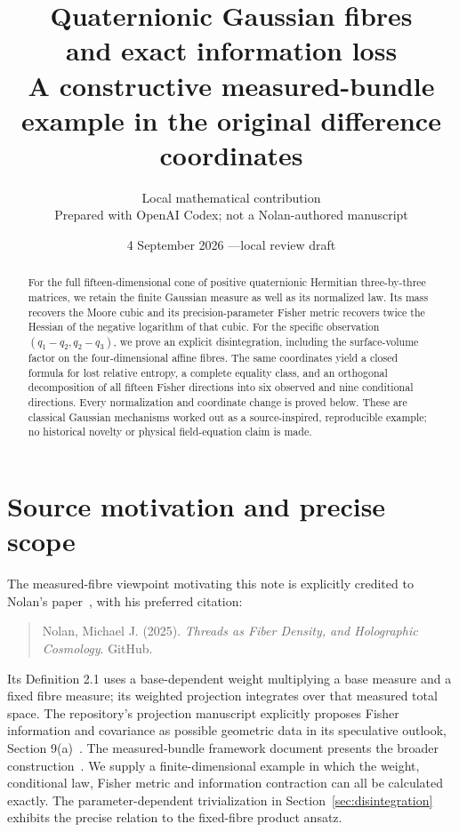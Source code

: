 \documentclass[11pt,a4paper]{article}
\title{Quaternionic Gaussian fibres\\and exact information loss\\[4pt]
\large A constructive measured-bundle example in the original difference coordinates}
\author{Local mathematical contribution\\\small Prepared with OpenAI Codex; not a Nolan-authored manuscript}
\date{4 September 2026 \quad---\quad local review draft}
\numberwithin{equation}{section}
\theoremstyle{definition}
\theoremstyle{remark}
\begin{document}
\maketitle
\begin{abstract}
For the full fifteen-dimensional cone of positive quaternionic Hermitian
three-by-three matrices, we retain the finite Gaussian measure as well as its
normalized law. Its mass recovers the Moore cubic and its precision-parameter
Fisher metric recovers twice the Hessian of the negative logarithm of that cubic.
For the specific observation $(q_1-q_2,q_2-q_3)$, we prove an explicit
disintegration, including the surface-volume factor on the four-dimensional
affine fibres. The same coordinates yield a closed formula for lost relative
entropy, a complete equality class, and an orthogonal decomposition of all
fifteen Fisher directions into six observed and nine conditional directions.
Every normalization and coordinate change is proved below. These are classical
Gaussian mechanisms worked out as a source-inspired, reproducible example;
no historical novelty or physical field-equation claim is made.
\end{abstract}

\section{Source motivation and precise scope}\label{sec:source}

The measured-fibre viewpoint motivating this note is explicitly credited to
Nolan's paper~\cite{Nolan2025Threads}, with his preferred citation:
\begin{quote}
Nolan, Michael J. (2025). \emph{Threads as Fiber Density, and Holographic
Cosmology}. GitHub.
\end{quote}
Its Definition 2.1 uses a
base-dependent weight multiplying a base measure and a fixed fibre measure;
its weighted projection integrates over that measured total space. The
repository's projection manuscript explicitly proposes Fisher information
and covariance as possible geometric data in its speculative outlook,
Section 9(a)~\cite{NolanRepository2025Projection}. The measured-bundle
framework document presents the broader construction~\cite{NolanRepository2025MBPF}.
We supply a finite-dimensional example in which the weight, conditional law,
Fisher metric and information contraction can all be calculated exactly.
The parameter-dependent trivialization in Section~\ref{sec:disintegration}
exhibits the precise relation to the fixed-fibre product ansatz.
\end{document}
